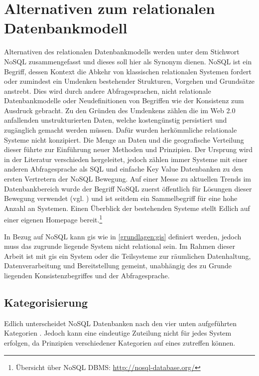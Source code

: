\section{Alternativen zum relationalen Datenbankmodell}
\label{nosql}
Alternativen des relationalen Datenbankmodells werden unter dem Stichwort NoSQL zusammengefasst und dieses soll hier als Synonym dienen.
NoSQL ist ein Begriff, dessen Kontext die Abkehr von klassischen relationalen Systemen fordert oder zumindest ein Umdenken bestehender Strukturen, Vorgehen und Grundsätze anstrebt.
Dies wird durch andere Abfragesprachen, nicht relationale Datenbankmodelle oder Neudefinitionen von Begriffen wie der Konsistenz zum Ausdruck gebracht.
Zu den Gründen des Umdenkens zählen die im Web 2.0 anfallenden unstrukturierten Daten, welche kostengünstig persistiert und zugänglich gemacht werden müssen.
Dafür wurden herkömmliche relationale Systeme nicht konzipiert.
Die Menge an Daten und die geografische Verteilung dieser führte zur Einführung neuer Methoden und Prinzipien.
Der Ursprung wird in der Literatur verschieden hergeleitet, jedoch zählen immer Systeme mit einer anderen Abfragesprache als SQL und einfache Key Value Datenbanken zu den ersten Vertretern der NoSQL Bewegung.
Auf einer Messe zu aktuellen Trends im Datenbankbereich wurde der Begriff NoSQL zuerst öffentlich für Lösungen dieser Bewegung verwendet (vgl. \cite{website:originnosql}) und ist seitdem ein Sammelbegriff für eine hohe Anzahl an Systemen.
Einen Überblick der bestehenden Systeme stellt Edlich auf einer eigenen Homepage bereit.\footnote{Übersicht über NoSQL DBMS: \url{http://nosql-database.org/}}

In Bezug auf NoSQL kann \Gls{gis} wie in \ref{grundlagen:gis} definiert werden, jedoch muss das zugrunde liegende System nicht relational sein.
Im Rahmen dieser Arbeit ist mit \Gls{gis} ein System oder die Teilsysteme zur räumlichen Datenhaltung, Datenverarbeitung und Bereitstellung gemeint, unabhängig des zu Grunde liegenden Konsistenzbegriffes und der Abfragesprache.

\subsection{Kategorisierung}
Edlich unterscheidet NoSQL Datenbanken nach den vier unten aufgeführten Kategorien \cite{book:nosql-einfuehrung}.
Jedoch kann eine eindeutige Zuteilung nicht für jedes System erfolgen, da Prinzipien verschiedener Kategorien auf eines zutreffen können.

